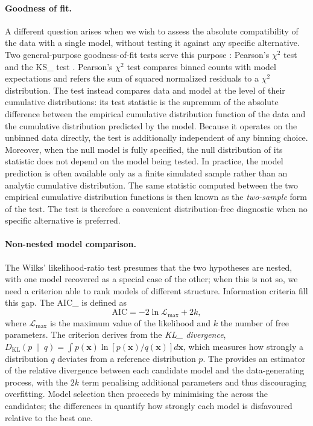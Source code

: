 \paragraph{Goodness of fit.}

A different question arises when we wish to assess the absolute compatibility of the data with a single model, without testing it against any specific alternative.
Two general-purpose goodness-of-fit tests serve this purpose \cite{Cowan:1998ji}: Pearson's $\chi^2$ test and the \gls{KS_} test \cite{KS_test}.
Pearson's $\chi^2$ test compares binned counts with model expectations and refers the sum of squared normalized residuals to a $\chi^2$ distribution.
The \KS test instead compares data and model at the level of their cumulative distributions: its test statistic is the supremum of the absolute difference between the empirical cumulative distribution function of the data and the cumulative distribution predicted by the model.
Because it operates on the unbinned data directly, the \KS test is additionally independent of any binning choice.
Moreover, when the null model is fully specified, the null distribution of its statistic does not depend on the model being tested.
In practice, the model prediction is often available only as a finite simulated sample rather than an analytic cumulative distribution.
The same statistic computed between the two empirical cumulative distribution functions is then known as the \emph{two-sample} form of the \KS test.
The \KS test is therefore a convenient distribution-free diagnostic when no specific alternative is preferred.

\paragraph{Non-nested model comparison.}

The Wilks' likelihood-ratio test presumes that the two hypotheses are nested, with one model recovered as a special case of the other; when this is not so, we need a criterion able to rank models of different structure.
Information criteria fill this gap.
The \gls{AIC_} \cite{Akaike:1974} is defined as
\begin{equation}
	\mathrm{AIC} = -2 \ln \mathcal{L}_{\max} + 2k,
	\label{eq:aic}
\end{equation}
where $\mathcal{L}_{\max}$ is the maximum value of the likelihood and $k$ the number of free parameters.
The criterion derives from the \emph{\gls{KL_} divergence}, $D_{\mathrm{KL}}(p \,\|\, q) = \int p(\mathbf{x}) \ln \left[ p(\mathbf{x}) / q(\mathbf{x}) \right] d\mathbf{x}$, which measures how strongly a distribution $q$ deviates from a reference distribution $p$.
The \AIC provides an estimator of the relative \KL divergence between each candidate model and the data-generating process, with the $2k$ term penalising additional parameters and thus discouraging overfitting.
Model selection then proceeds by minimising the \AIC across the candidates; the differences in \AIC quantify how strongly each model is disfavoured relative to the best one.

